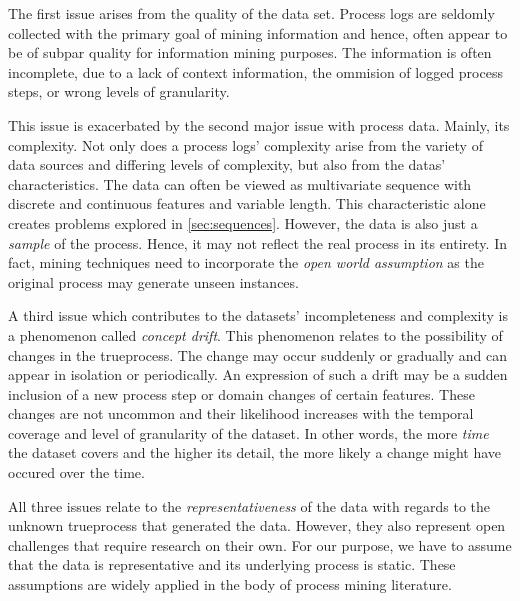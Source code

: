 \documentclass[./../../paper.tex]{subfiles}
\begin{document}
The first issue arises from the quality of the data set. Process logs are seldomly collected with the primary goal of mining information and hence, often appear to be of subpar quality for information mining purposes. The information is often incomplete, due to a lack of context information, the ommision of logged process steps, or wrong levels of granularity\autocite{vanderaalst_ProcessMiningManifesto_2012}.

This issue is exacerbated by the second major issue with process data. Mainly, its complexity. Not only does a process logs' complexity arise from the variety of data sources and differing levels of complexity, but also from the datas' characteristics. The data can often be viewed as multivariate sequence with discrete and continuous features and variable length. This characteristic alone creates problems explored in \autoref{sec:sequences}. However, the data is also just a \emph{sample} of the process. Hence, it may not reflect the real process in its entirety. In fact, mining techniques need to incorporate the \emph{open world assumption} as the original process may generate unseen \glspl{instance}\autocite{vanderaalst_ProcessMiningManifesto_2012}.

A third issue which contributes to the datasets' incompleteness and complexity is a phenomenon called \emph{concept drift}. This phenomenon relates to the possibility of changes in the \gls{trueprocess}. The change may occur suddenly or gradually and can appear in isolation or periodically. An expression of such a drift may be a sudden inclusion of a new process step or domain changes of certain features. These changes are not uncommon and their likelihood increases with the temporal coverage and level of granularity of the dataset\needscite{}. In other words, the more \emph{time} the dataset covers and the higher its detail, the more likely a change might have occured over the time.

All three issues relate to the \emph{representativeness} of the data with regards to the unknown \gls{trueprocess} that generated the data. However, they also represent open challenges that require research on their own. For our purpose, we have to assume that the data is representative and its underlying process is static. These assumptions are widely applied in the body of process mining literature\needscite{}.
\end{document}
